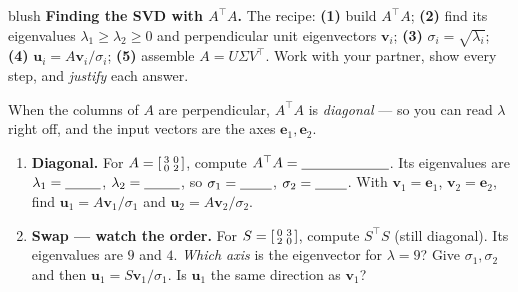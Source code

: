 \documentclass[10pt]{article}
\newcommand{\uu}{\mathbf{u}}
\newcommand{\vv}{\mathbf{v}}
\newcommand{\ee}{\mathbf{e}}
\newcommand{\T}{^{\top}}
\begin{document}
\namepartnerperiod

\vspace{0.10in}

\begin{headlinebox}{blush}
\small\textbf{Finding the SVD with $A\T A$.} The recipe: \textbf{(1)} build $A\T A$; \textbf{(2)} find its
eigenvalues $\lambda_1\ge\lambda_2\ge0$ and perpendicular unit eigenvectors $\vv_i$; \textbf{(3)}
$\sigma_i=\sqrt{\lambda_i}$; \textbf{(4)} $\uu_i=A\vv_i/\sigma_i$; \textbf{(5)} assemble $A=U\Sigma V\T$.
Work with your partner, show every step, and \emph{justify} each answer.
\end{headlinebox}

\vspace{0.10in}

\begin{tcolorbox}[colback=white, colframe=black!40, title=\textbf{Tier R --- Remediate},
    fonttitle=\bfseries, arc=1.5mm, left=3mm, right=3mm, top=2mm, bottom=2mm, breakable]
When the columns of $A$ are perpendicular, $A\T A$ is \emph{diagonal} --- so you can read $\lambda$ right
off, and the input vectors are the axes $\ee_1,\ee_2$.
\begin{enumerate}[leftmargin=1.7em, itemsep=9pt]
  \item \textbf{Diagonal.} For $A=\begin{bsmallmatrix} 3 & 0\\ 0 & 2 \end{bsmallmatrix}$, compute
        $A\T A=\blank{2.2cm}$. Its eigenvalues are $\lambda_1=\blank{0.9cm}$, $\lambda_2=\blank{0.9cm}$,
        so $\sigma_1=\blank{0.8cm}$, $\sigma_2=\blank{0.8cm}$. With $\vv_1=\ee_1$, $\vv_2=\ee_2$, find
        $\uu_1=A\vv_1/\sigma_1$ and $\uu_2=A\vv_2/\sigma_2$. \writeline
  \item \textbf{Swap --- watch the order.} For $S=\begin{bsmallmatrix} 0 & 3\\ 2 & 0 \end{bsmallmatrix}$,
        compute $S\T S$ (still diagonal). Its eigenvalues are $9$ and $4$. \emph{Which axis} is the
        eigenvector for $\lambda=9$? Give $\sigma_1,\sigma_2$ and then $\uu_1=S\vv_1/\sigma_1$. Is $\uu_1$
        the same direction as $\vv_1$? 
\end{enumerate}
\end{tcolorbox}
\end{document}
